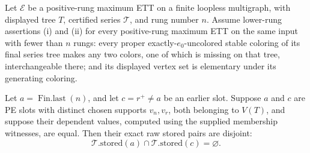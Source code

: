\begin{helper}
Let \(\mathcal E\) be a positive-rung maximum ETT on a finite loopless
multigraph, with displayed tree \(T\), certified series \(\mathcal T\), and
rung number \(n\).  Assume lower-rung assertions (i) and (ii) for every positive-rung
maximum ETT on the same input with fewer than \(n\) rungs: every proper
exactly-\(e_0\)-uncolored stable coloring of its final series tree makes any
two colors, one of which is missing on that tree, interchangeable there;
and its displayed vertex set is elementary under its generating coloring.

Let \(a=\operatorname{Fin.last}(n)\), and let \(c=r^+\ne a\) be an earlier
slot.  Suppose \(a\) and \(c\) are PE slots with distinct chosen supports
\(v_n,v_r\), both belonging to \(V(T)\), and suppose their dependent
 values, computed using the supplied
membership witnesses, are equal.  Then their exact raw stored pairs are
disjoint:
\[
 \mathcal T.\mathrm{stored}(a)\cap
 \mathcal T.\mathrm{stored}(c)=\varnothing.
\]
\end{helper}
